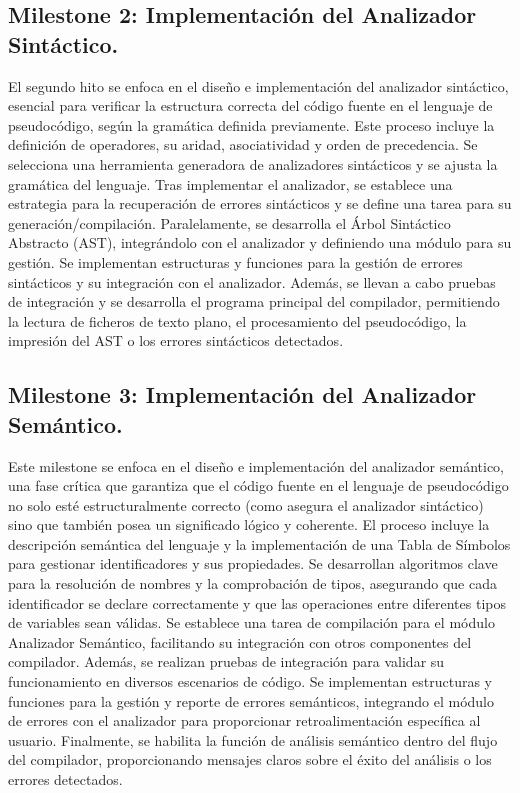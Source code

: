 \subsection{Milestone 2: Implementación del Analizador Sintáctico.}\label{subsection:PMV2}
El segundo hito se enfoca en el diseño e implementación del analizador sintáctico, esencial para verificar la estructura correcta del código fuente en el lenguaje de pseudocódigo, según la gramática definida previamente. Este proceso incluye la definición de operadores, su aridad, asociatividad y orden de precedencia. Se selecciona una herramienta generadora de analizadores sintácticos y se ajusta la gramática del lenguaje. Tras implementar el analizador, se establece una estrategia para la recuperación de errores sintácticos y se define una tarea para su generación/compilación. Paralelamente, se desarrolla el Árbol Sintáctico Abstracto (AST), integrándolo con el analizador y definiendo una módulo para su gestión. Se implementan estructuras y funciones para la gestión de errores sintácticos y su integración con el analizador. Además, se llevan a cabo pruebas de integración y se desarrolla el programa principal del compilador, permitiendo la lectura de ficheros de texto plano, el procesamiento del pseudocódigo, la impresión del AST o los errores sintácticos detectados.

\subsection{Milestone 3: Implementación del Analizador Semántico.}\label{subsection:PMV3}
Este milestone se enfoca en el diseño e implementación del analizador semántico, una fase crítica que garantiza que el código fuente en el lenguaje de pseudocódigo no solo esté estructuralmente correcto (como asegura el analizador sintáctico) sino que también posea un significado lógico y coherente. El proceso incluye la descripción semántica del lenguaje y la implementación de una Tabla de Símbolos para gestionar identificadores y sus propiedades. Se desarrollan algoritmos clave para la resolución de nombres y la comprobación de tipos, asegurando que cada identificador se declare correctamente y que las operaciones entre diferentes tipos de variables sean válidas. Se establece una tarea de compilación para el módulo Analizador Semántico, facilitando su integración con otros componentes del compilador. Además, se realizan pruebas de integración para validar su funcionamiento en diversos escenarios de código. Se implementan estructuras y funciones para la gestión y reporte de errores semánticos, integrando el módulo de errores con el analizador para proporcionar retroalimentación específica al usuario. Finalmente, se habilita la función de análisis semántico dentro del flujo del compilador, proporcionando mensajes claros sobre el éxito del análisis o los errores detectados.

